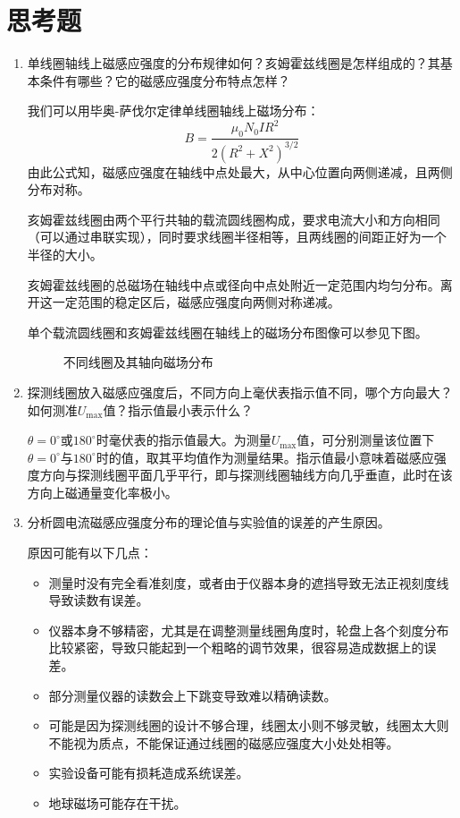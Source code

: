 \documentclass[12pt]{article}
\begin{document}
\section{思考题}
\begin{enumerate}
    \item {\kaishu 单线圈轴线上磁感应强度的分布规律如何？亥姆霍兹线圈是怎样组成的？其基本条件有哪些？它的磁感应强度分布特点怎样？}
    
    我们可以用毕奥-萨伐尔定律单线圈轴线上磁场分布：
    \[
        B=\frac{\mu_0N_0IR^2}{2(R^2+X^2)^{3/2}}
    \]
    由此公式知，磁感应强度在轴线中点处最大，从中心位置向两侧递减，且两侧分布对称。

    亥姆霍兹线圈由两个平行共轴的载流圆线圈构成，要求电流大小和方向相同（可以通过串联实现），同时要求线圈半径相等，且两线圈的间距正好为一个半径的大小。

    亥姆霍兹线圈的总磁场在轴线中点或径向中点处附近一定范围内均匀分布。离开这一定范围的稳定区后，磁感应强度向两侧对称递减。

    单个载流圆线圈和亥姆霍兹线圈在轴线上的磁场分布图像可以参见下图。

    \begin{figure}[htbp]
        \centering
        \caption{不同线圈及其轴向磁场分布}
    \end{figure}
    
    \item {\kaishu 探测线圈放入磁感应强度后，不同方向上毫伏表指示值不同，哪个方向最大？如何测准$U_\max$值？指示值最小表示什么？}
    
    $\theta=0^\circ$或$180^\circ$时毫伏表的指示值最大。为测量$ U_\max $值，可分别测量该位置下$ \theta=0^\circ $与$ 180^\circ $时的值，取其平均值作为测量结果。指示值最小意味着磁感应强度方向与探测线圈平面几乎平行，即与探测线圈轴线方向几乎垂直，此时在该方向上磁通量变化率极小。

    \item {\kaishu 分析圆电流磁感应强度分布的理论值与实验值的误差的产生原因。}
    
    原因可能有以下几点：

    \begin{itemize}
        \item 测量时没有完全看准刻度，或者由于仪器本身的遮挡导致无法正视刻度线导致读数有误差。
        \item 仪器本身不够精密，尤其是在调整测量线圈角度时，轮盘上各个刻度分布比较紧密，导致只能起到一个粗略的调节效果，很容易造成数据上的误差。
        \item 部分测量仪器的读数会上下跳变导致难以精确读数。
        \item 可能是因为探测线圈的设计不够合理，线圈太小则不够灵敏，线圈太大则不能视为质点，不能保证通过线圈的磁感应强度大小处处相等。
        \item 实验设备可能有损耗造成系统误差。
        \item 地球磁场可能存在干扰。
    \end{itemize}
\end{enumerate}
\end{document}
